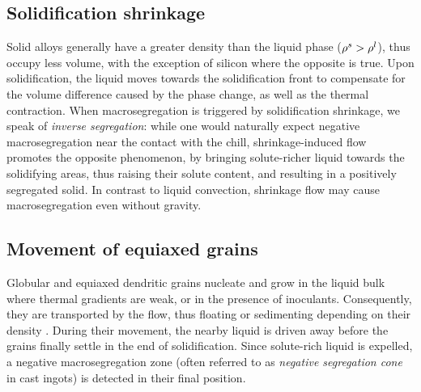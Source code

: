 %
%
% 
\subsection{Solidification shrinkage}
Solid alloys generally have a greater density than the liquid phase ($\rho^s > \rho^l$), 
thus occupy less volume, with the exception of silicon where the opposite is true. 
Upon solidification, the liquid moves towards the solidification front to compensate for the volume 
difference caused by the phase change, as well as the thermal contraction. When macrosegregation is 
triggered by solidification shrinkage, we speak of \emph{inverse segregation}: while one would naturally expect 
negative macrosegregation near the contact with the chill, shrinkage-induced flow 
promotes the opposite phenomenon, by bringing solute-richer liquid towards the solidifying areas, thus raising 
their solute content, and resulting in a positively segregated solid.
In contrast to liquid convection, shrinkage flow may cause macrosegregation even without gravity.
%
%
\subsection{Movement of equiaxed grains}
%
Globular and equiaxed dendritic grains nucleate and grow in the liquid bulk where thermal gradients 
are weak, or in the presence of inoculants. Consequently, they are transported by the flow, thus floating 
or sedimenting depending on their density \citep{beckermann_modelling_2002}. During their movement, the nearby 
liquid is driven away before the grains finally settle in the end of solidification. Since solute-rich liquid
is expelled, a negative macrosegregation zone (often referred to as \emph{negative segregation cone} in cast ingots) 
is detected in their final position.
%
%

